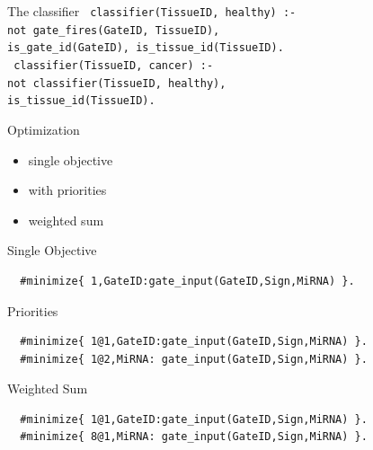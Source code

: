 \documentclass[10pt,dvipsnames]{beamer}
\begin{document}
\begin{frame}{The classifier}
 \texttt{
  classifier(TissueID, healthy) :-\\
    \quad not gate\_fires(GateID, TissueID),\\
    \quad is\_gate\_id(GateID), is\_tissue\_id(TissueID).\\
 }
 \vspace{1cm}
 \texttt{
  classifier(TissueID, cancer) :-\\
    \quad not classifier(TissueID, healthy),\\
    \quad is\_tissue\_id(TissueID).
 }
\end{frame}



\begin{frame}{Optimization}
 \begin{itemize}
  \item single objective
  \item with priorities
  \item weighted sum
 \end{itemize}
\end{frame}

\begin{frame}[fragile]{Single Objective}
 \begin{verbatim}
  #minimize{ 1,GateID:gate_input(GateID,Sign,MiRNA) }.
 \end{verbatim}
\end{frame}

\begin{frame}[fragile]{Priorities}
 \begin{verbatim}
  #minimize{ 1@1,GateID:gate_input(GateID,Sign,MiRNA) }.
  #minimize{ 1@2,MiRNA: gate_input(GateID,Sign,MiRNA) }.
 \end{verbatim}
\end{frame}

\begin{frame}[fragile]{Weighted Sum}
 \begin{verbatim}
  #minimize{ 1@1,GateID:gate_input(GateID,Sign,MiRNA) }.
  #minimize{ 8@1,MiRNA: gate_input(GateID,Sign,MiRNA) }.
 \end{verbatim}
\end{frame}
\end{document}

